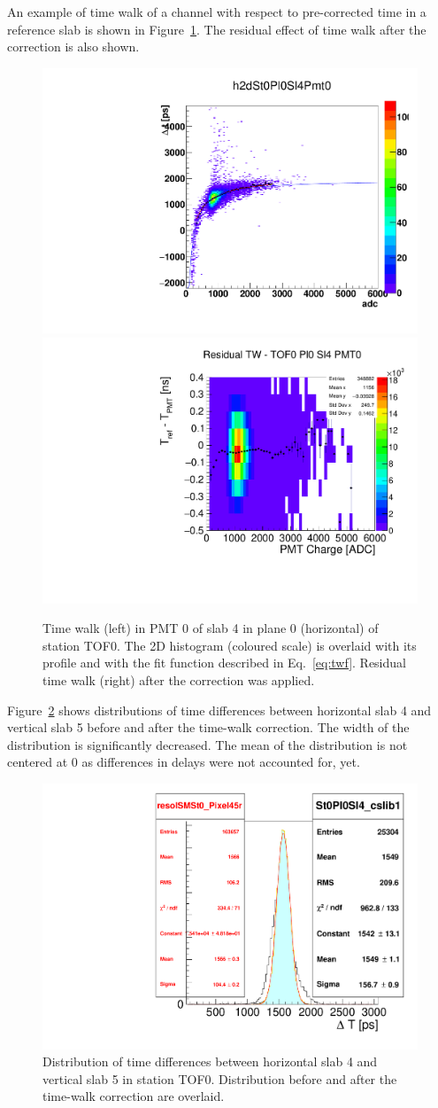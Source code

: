 An example of time walk of a channel with respect to pre-corrected
time in a reference slab is shown in Figure~\ref{fig:TW}. The residual
effect of time walk after the correction is also shown.

\begin{figure}
  \begin{center}
  \includegraphics[width=0.40\columnwidth]{01_tw_example}
  \includegraphics[width=0.45\columnwidth]{03_residual_tw_example} \\
  \caption{Time walk (left) in PMT 0 of slab 4 in plane 0 (horizontal)
    of station TOF0. The 2D histogram (coloured scale) is overlaid
    with its profile and with the fit function described in
    Eq.~\ref{eq:twf}.  Residual time walk (right) after the
    correction was applied.  }
  \label{fig:TW}
  \end{center}
\end{figure}



Figure~\ref{fig:SlabDTTW} shows distributions of time differences
between horizontal slab 4 and vertical slab 5 before and after the
time-walk correction. The width of the distribution is significantly
decreased. The mean of the distribution is not centered at 0 as
differences in delays \Tzero{} were not accounted for, yet.

\begin{figure}
  \begin{center}
  \includegraphics[width=0.5\columnwidth]{02_slab_dt_resolution_tw_effect}
  \caption{Distribution of time differences \DT{} between horizontal slab 4 and
    vertical slab 5 in station TOF0. Distribution before and after the
  time-walk correction are overlaid.}
  \label{fig:SlabDTTW}
  \end{center}
\end{figure}


